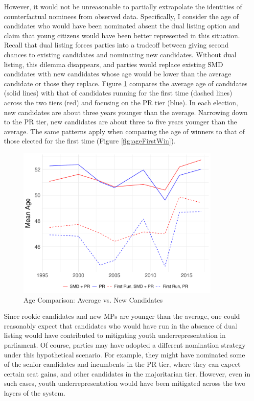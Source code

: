 \documentclass[a4paper, 11pt]{article}
\begin{document}
However, it would not be unreasonable to partially extrapolate the identities of counterfactual nominees from observed data. Specifically, I consider the age of candidates who would have been nominated absent the dual listing option and claim that young citizens would have been better represented in this situation. Recall that dual listing forces parties into a tradeoff between giving second chances to existing candidates and nominating new candidates. Without dual listing, this dilemma disappears, and parties would replace existing SMD candidates with new candidates whose age would be lower than the average candidate or those they replace. Figure \ref{fig:ageFirstRun} compares the average age of candidates (solid lines) with that of candidates running for the first time (dashed lines) across the two tiers (red) and focusing on the PR tier (blue). In each election, new candidates are about three years younger than the average. Narrowing down to the PR tier, new candidates are about three to five years younger than the average. The same patterns apply when comparing the age of winners to that of those elected for the first time (Figure \ref{fig:ageFirstWin}). 

\begin{figure}[!htbp]
	\includegraphics[width = 0.9\textwidth]{../figure/paper/age_first_run.pdf}
	\caption{Age Comparison: Average vs. New Candidates}
	\label{fig:ageFirstRun}
\end{figure}

Since rookie candidates and new MPs are younger than the average, one could reasonably expect that candidates who would have run in the absence of dual listing would have contributed to mitigating youth underrepresentation in parliament. Of course, parties may have adopted a different nomination strategy under this hypothetical scenario. For example, they might have nominated some of the senior candidates and incumbents in the PR tier, where they can expect certain seat gains, and other candidates in the majoritarian tier. However, even in such cases, youth underrepresentation would have been mitigated across the two layers of the system. 
\end{document}
